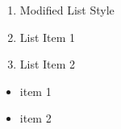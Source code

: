 


    \begin{enumerate}
        \item Modified List Style
        \item List Item 1
        \item List Item 2
    \end{enumerate}
    \begin{itemize}
        \item item 1
        \item item 2
    \end{itemize}



